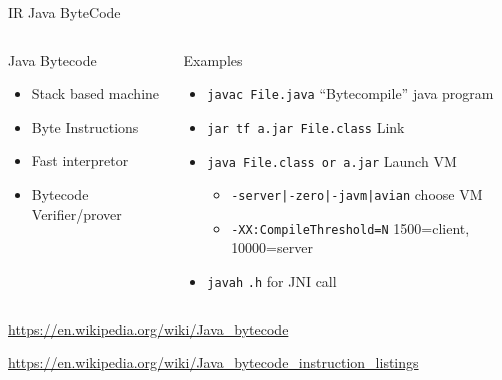 %
\begin{Frame}{IR Java ByteCode}
  \begin{columns}[t]
    \begin{column}{\BW} %
      \begin{block}{Java Bytecode}
        \begin{itemize}
        \item Stack based machine
        \item Byte Instructions
        \item Fast interpretor
        \item Bytecode Verifier/prover
        \end{itemize}
      \end{block} 
    \end{column}
    
    \begin{column}{\BW} %
      \begin{block}{Examples}
        \begin{itemize}
        \item \texttt{javac File.java} ``Bytecompile'' java program
        \item \texttt{jar tf a.jar File.class} Link
        \item \texttt{java File.class or a.jar} Launch VM
          \begin{itemize}
          \item \texttt{-server|-zero|-javm|avian} choose VM
          \item \texttt{-XX:CompileThreshold=N} 1500=client,
            10000=server
          \end{itemize}
        \item \texttt{javah} \texttt{.h} for JNI call
        \end{itemize}
      \end{block}   
    \end{column}
  \end{columns}  
\url{https://en.wikipedia.org/wiki/Java_bytecode}

\url{https://en.wikipedia.org/wiki/Java_bytecode_instruction_listings}
\end{Frame}


